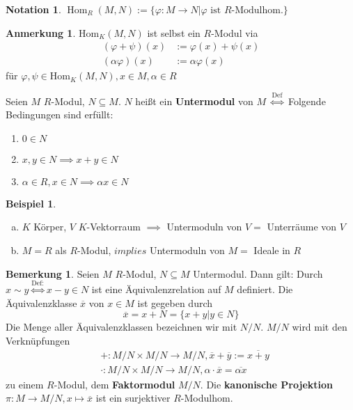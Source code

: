\documentclass[a4paper, titlepage]{article}
\theoremstyle{definition}
\newtheorem{bsp}[satz]{Beispiel}
\newtheorem{bem}[satz]{Bemerkung}
\newtheorem*{anm}{Anmerkung}
\newtheorem*{notation}{Notation}
\newcommand{\Hom}{\mathrm{Hom}}
\newcommand{\Def}{\overset{\text{Def:}}{\Leftrightarrow}}
\begin{document}
        \begin{notation}
            $\operatorname{Hom}_R(M,N):=\{\varphi:M\longrightarrow N|\varphi \text{ ist }R\text{-Modulhom.}\}$
        \end{notation}
        \begin{anm}
            $\Hom_K(M,N)$ ist selbst ein $R$-Modul via 
            \begin{align*}
                (\varphi+\psi)(x)&:=\varphi(x)+\psi(x)\\
                (\alpha\varphi)(x)&:=\alpha\varphi(x)
            \end{align*}
            für $\varphi,\psi\in \Hom_K(M,N), x\in M , \alpha\in R$
        \end{anm}
        \begin{definition}
            Seien $M$ $R$-Modul, $N\subseteq M$. \newline 
            $N$ heißt ein \textbf{Untermodul} von $M$ $\overset{\text{Def}}{\Leftrightarrow}$ Folgende Bedingungen sind erfüllt:
            \begin{enumerate}[(U1)]
                \item $0\in N$
                \item $x,y\in N\implies x+y\in N$
                \item $\alpha \in R, x\in N\implies \alpha x \in N$
            \end{enumerate}
        \end{definition}
        \begin{bsp}
            \begin{enumerate}[(a)]
                \item $K$ Körper, $V$ $K$-Vektorraum $\implies $ Untermoduln von $V=$ Unterräume von $V$
                \item $M=R$ als $R$-Modul, $implies $ Untermoduln von $M = $ Ideale in $R$
            \end{enumerate}
        \end{bsp}
        \begin{bem}
            Seien $M$ $R$-Modul, $N\subseteq M$ Untermodul.\newline
            Dann gilt: Durch $x \sim y \Def x-y\in N$ ist eine Äquivalenzrelation auf $M$ definiert. Die Äquivalenzklasse $\overline{x}$ von $x\in M $ ist gegeben durch 
            $$\overline{x}=x+N=\{x+y|y\in N\}$$
            Die Menge aller Äquivalenzklassen bezeichnen wir mit $N/N.$ $M/N$ wird mit den Verknüpfungen 
            \begin{align*}
            &+:M/N\times M/N \longrightarrow M/N, \overline{x}+\overline{y}:=\overline{x+y}\\
            &\cdot:M/N\times M/N \longrightarrow M/N, \alpha\cdot \overline{x}=\overline{\alpha x}
            \end{align*}
            zu einem $R$-Modul, dem \textbf{Faktormodul} $M/N.$
            Die \textbf{kanonische Projektion} $\pi:M\longrightarrow M/N,x\mapsto \overline{x}$ ist ein surjektiver $R$-Modulhom.
        \end{bem}
\end{document}
